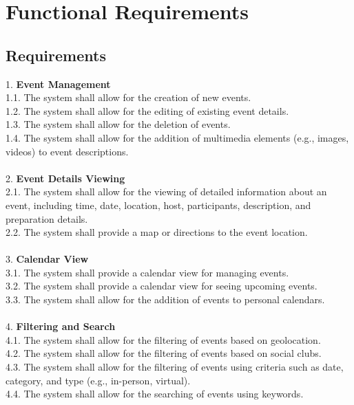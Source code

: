 \documentclass[a4paper,12pt]{article}
\begin{document}
\section{Functional Requirements}
\label{sec:functional-requirements}

\subsection{Requirements}

1. \textbf{Event Management}\\
    1.1. The system shall allow for the creation of new events.\\
    1.2. The system shall allow for the editing of existing event details.\\
    1.3. The system shall allow for the deletion of events.\\
    1.4. The system shall allow for the addition of multimedia elements (e.g., images, videos) to event descriptions.\\\\
2. \textbf{Event Details Viewing}\\
    2.1. The system shall allow for the viewing of detailed information about an event, including time, date, 
    location, host, participants, description, and preparation details.\\
    2.2. The system shall provide a map or directions to the event location.\\\\
3. \textbf{Calendar View}\\
    3.1. The system shall provide a calendar view for managing events.\\
    3.2. The system shall provide a calendar view for seeing upcoming events.\\
    3.3. The system shall allow for the addition of events to personal calendars.\\\\
4. \textbf{Filtering and Search}\\
    4.1. The system shall allow for the filtering of events based on geolocation.\\
    4.2. The system shall allow for the filtering of events based on social clubs.\\
    4.3. The system shall allow for the filtering of events using criteria such as date, category, and type (e.g., in-person, virtual).\\
    4.4. The system shall allow for the searching of events using keywords.\\
\end{document}
